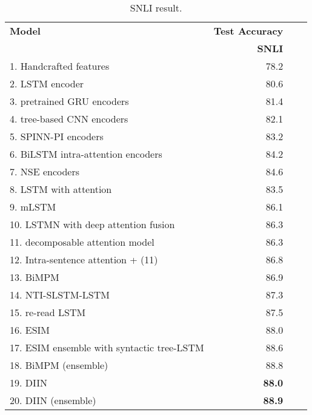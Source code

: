 \documentclass{article} \usepackage{iclr2018_conference,times}
\begin{document}
\begin{table*}
\centering
\small
\begin{tabular}{l r r r}
\toprule
{\bf Model} & 
\multicolumn{1}{c}{\bf Test Accuracy} \\

{}    & {\bf SNLI} \\
\midrule
1. Handcrafted features\citep{snli_2015arXiv150805326B} & 78.2 \\
\midrule
2. LSTM encoder\citep{spinnBowman:2016um} & 80.6 \\ 
3. pretrained GRU encoders\citep{pretrainGRU_Vendrov:2015ua} & 81.4 \\ 
4. tree-based CNN encoders\citep{treeCNN_Mou:2015tp}  & 82.1 \\
5. SPINN-PI encoders\citep{spinnBowman:2016um} & 83.2 \\
6. BiLSTM intra-attention encoders\citep{bilstm_intraatt_Liu:2016tz} & 84.2 \\
7. NSE encoders\citep{NSEMunkhdalai:2016th}  & 84.6  \\
\midrule
8. LSTM with attention\citep{LSTM_att_Rocktaschel:2015wu} & 83.5 \\
9. mLSTM\citep{mLSTM_Wang:2015vx} & 86.1 \\ 
10. LSTMN with deep attention fusion\citep{LSTMN_Cheng:2016wu} & 86.3 \\
11. decomposable attention model\citep{decomposable_Parikh:2016tz} &86.3 \\
12. Intra-sentence attention + (11)\citep{decomposable_Parikh:2016tz}& 86.8 \\
13. BiMPM\citep{BIMPM_Wang:2017td} & 86.9 \\
14. NTI-SLSTM-LSTM\citep{NTI_Yu:2017wd} & 87.3 \\
15. re-read LSTM\citep{re_read_Sha:2016ws} & 87.5 \\
16. ESIM\citep{ESIM_Chen:2016wn} & 88.0\\
17. ESIM ensemble with syntactic tree-LSTM\citep{ESIM_Chen:2016wn} & 88.6  \\
18. BiMPM (ensemble)\citep{BIMPM_Wang:2017td} & 88.8 \\
\midrule
19. DIIN & \textbf{88.0} \\
20. DIIN (ensemble) & \textbf{88.9} \\
\bottomrule
\end{tabular}

\caption{SNLI result.\label{tab:snli_result}}
\end{table*}
\end{document}
